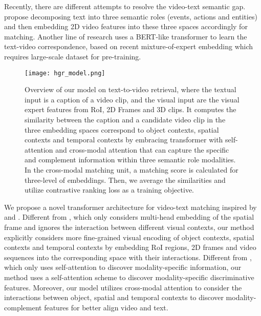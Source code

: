 \documentclass{article}
\begin{document}
Recently, there are different attempts to resolve the video-text semantic gap. \cite{Chen_2020_CVPR} propose decomposing text into three semantic roles (events, actions and entities) and then embedding 2D video features into these three spaces accordingly for matching. Another line of research uses a BERT-like transformer \cite{NIPS2017_3f5ee243,gabeur2020mmt, devlin-etal-2019-bert} to learn the text-video correspondence, based on recent mixture-of-expert embedding \cite{miech18learning} which requires large-scale dataset for pre-training. 

\begin{figure*}[htb]
\centering
\centerline{\texttt{[image: hgr\_model.png]}}

\caption{Overview of our model on text-to-video retrieval, where the textual input is a caption of a video clip, and the visual input are the visual expert features from RoI, 2D Frames and 3D clips. It computes the similarity between the caption and a candidate video clip in the three embedding spaces correspond to object contexts, spatial contexts and temporal contexts by embracing transformer with self-attention and cross-modal attention that can capture the specific and complement information within three semantic role modalities. In the cross-modal matching unit, a matching score is calculated for three-level of embeddings. Then, we average the similarities and utilize contrastive ranking loss as a training objective. }
\label{fig:res2}
\end{figure*}

We propose a novel transformer architecture for video-text matching inspired by \cite{Chen_2020_CVPR} and \cite{NIPS2017_3f5ee243,gabeur2020mmt, devlin-etal-2019-bert}. Different from \cite{Chen_2020_CVPR}, which only considers multi-head embedding of the spatial frame and ignores the interaction between different visual contexts, our method explicitly considers more fine-grained visual encoding of object contexts, spatial contexts and temporal contexts by embedding RoI regions, 2D frames and video sequences into the corresponding space with their interactions. Different from \cite{NIPS2017_3f5ee243,gabeur2020mmt, devlin-etal-2019-bert}, which only uses self-attention to discover modality-specific information, our method uses a self-attention scheme to discover modality-specific discriminative features.  Moreover, our model utilizes cross-modal attention to consider the interactions between object, spatial and temporal contexts to discover modality-complement features for better align video and text.
\end{document}
